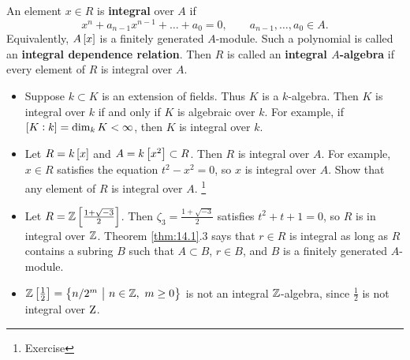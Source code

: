 
\begin{definition}
An element $ x \in R $ is \textbf{integral} over $ A $ if
$$ x^n + a_{n - 1}x^{n - 1} + \dots + a_0 = 0, \qquad a_{n - 1}, \dots, a_0 \in A. $$
Equivalently, $ A\sbr{x} $ is a finitely generated $ A $-module. Such a polynomial is called an \textbf{integral dependence relation}. Then $ R $ is called an \textbf{integral $ A $-algebra} if every element of $ R $ is integral over $ A $.
\end{definition}

\begin{example*}
\hfill
\begin{itemize}
\item Suppose $ k \subset K $ is an extension of fields. Thus $ K $ is a $ k $-algebra. Then $ K $ is integral over $ k $ if and only if $ K $ is algebraic over $ k $. For example, if $ \sbr{K : k} = \dim_k K < \infty $, then $ K $ is integral over $ k $.
\item Let $ R = k\sbr{x} $ and $ A = k\sbr{x^2} \subset R $. Then $ R $ is integral over $ A $. For example, $ x \in R $ satisfies the equation $ t^2 - x^2 = 0 $, so $ x $ is integral over $ A $. Show that any element of $ R $ is integral over $ A $. \footnote{Exercise}
\item Let $ R = \ZZ\sbr{\tfrac{1 + \sqrt{-3}}{2}} $. Then $ \zeta_3 = \tfrac{1 + \sqrt{-3}}{2} $ satisfies $ t^2 + t + 1 = 0 $, so $ R $ is in integral over $ \mathbb{Z} $. Theorem \ref{thm:14.1}.$ 3 $ says that $ r \in R $ is integral as long as $ R $ contains a subring $ B $ such that $ A \subset B $, $ r \in B $, and $ B $ is a finitely generated $ A $-module.
\item $ \ZZ\sbr{\tfrac{1}{2}} = \cbr{n / 2^m \st n \in \ZZ, \ m \ge 0} $ is not an integral $ \mathbb{Z} $-algebra, since $ \tfrac{1}{2} $ is not integral over $ \mathrm{Z} $.
\end{itemize}
\end{example*}

